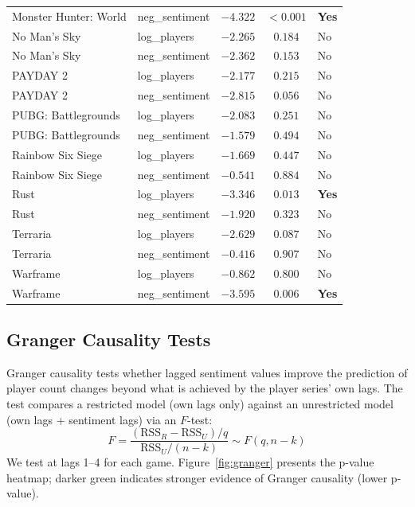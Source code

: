 \documentclass[11pt, letterpaper]{article}
\begin{document}
\begin{table}[H]
\begin{tabular}{llccl}
Monster Hunter: World & neg\_sentiment & $-4.322$ & $<0.001$ & \textbf{Yes} \\
No Man's Sky          & log\_players   & $-2.265$ & $0.184$ & No \\
No Man's Sky          & neg\_sentiment & $-2.362$ & $0.153$ & No \\
PAYDAY 2              & log\_players   & $-2.177$ & $0.215$ & No \\
PAYDAY 2              & neg\_sentiment & $-2.815$ & $0.056$ & No \\
PUBG: Battlegrounds   & log\_players   & $-2.083$ & $0.251$ & No \\
PUBG: Battlegrounds   & neg\_sentiment & $-1.579$ & $0.494$ & No \\
Rainbow Six Siege     & log\_players   & $-1.669$ & $0.447$ & No \\
Rainbow Six Siege     & neg\_sentiment & $-0.541$ & $0.884$ & No \\
Rust                  & log\_players   & $-3.346$ & $0.013$ & \textbf{Yes} \\
Rust                  & neg\_sentiment & $-1.920$ & $0.323$ & No \\
Terraria              & log\_players   & $-2.629$ & $0.087$ & No \\
Terraria              & neg\_sentiment & $-0.416$ & $0.907$ & No \\
Warframe              & log\_players   & $-0.862$ & $0.800$ & No \\
Warframe              & neg\_sentiment & $-3.595$ & $0.006$ & \textbf{Yes} \\
\bottomrule
\end{tabular}
\end{table}

\subsection{Granger Causality Tests}\label{sec:granger}

Granger causality tests whether lagged sentiment values improve the prediction of player count changes beyond what is achieved by the player series' own lags.
The test compares a restricted model (own lags only) against an unrestricted model (own lags + sentiment lags) via an $F$-test:
\[
    F = \frac{(\text{RSS}_R - \text{RSS}_U)/q}{\text{RSS}_U/(n-k)} \sim F(q, n-k)
\]
We test at lags 1--4 for each game.
Figure~\ref{fig:granger} presents the p-value heatmap; darker green indicates stronger evidence of Granger causality (lower p-value).
\end{document}
